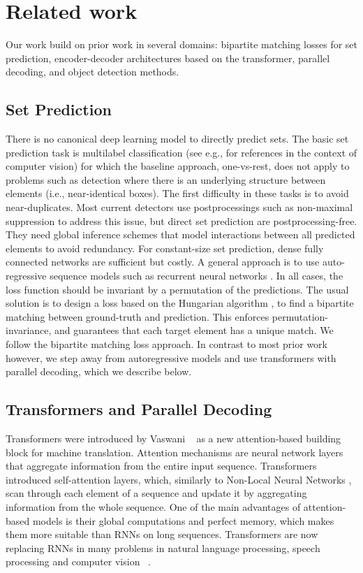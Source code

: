 
\section{Related work}

Our work build on prior work in several domains: bipartite matching losses for set prediction, encoder-decoder architectures based on the transformer, parallel decoding, and object detection methods.

\subsection{Set Prediction} There is no canonical deep learning model to directly predict sets. The basic set prediction task is multilabel classification (see e.g., \cite{rezatofighi2017deepsetnet,pineda2019ElucidatingIP} for references in the context of computer vision) for which the baseline approach, one-vs-rest, does not apply to problems such as detection where there is an underlying structure between elements (i.e., near-identical boxes). The first difficulty in these tasks is to avoid near-duplicates. Most current detectors use postprocessings such as non-maximal suppression to address this issue, but direct set prediction are postprocessing-free. They need global inference schemes that model interactions between all predicted elements to avoid redundancy. For constant-size set prediction, dense fully connected networks \cite{erhan2014scalable} are sufficient but costly. A general approach is to use auto-regressive sequence models such as recurrent neural networks \cite{vinyals2016order}. In all cases, the loss function should be invariant by a permutation of the predictions. The usual solution is to design a loss  based on the Hungarian algorithm \cite{Kuhn1955TheHM}, to find a bipartite matching between ground-truth and prediction. This enforces permutation-invariance, and guarantees that each target element has a unique match. We follow the bipartite matching loss approach. In contrast to most prior work however, we step away from autoregressive models and use transformers with parallel decoding, which we describe below.

\subsection{Transformers and Parallel Decoding}
Transformers were introduced by Vaswani \etal~\cite{Vaswani2017AttentionIA} as a new attention-based building block for machine translation. Attention mechanisms \cite{bahdanau2015neural} are neural network layers that aggregate information from the entire input sequence. Transformers introduced self-attention layers, which, similarly to Non-Local Neural Networks \cite{Wang2017NonlocalNN}, scan through each element of a sequence and update it by aggregating information from the whole sequence. One of the main advantages of attention-based models is their global computations and perfect memory, which makes them more suitable than RNNs on long sequences. Transformers are now replacing RNNs in many problems in natural language processing, speech processing and computer vision ~\cite{Devlin2019BERTPO,Lscher2019RWTHAS,synnaeve2019end,Radford2019LanguageMA,Parmar2018ImageT}.


